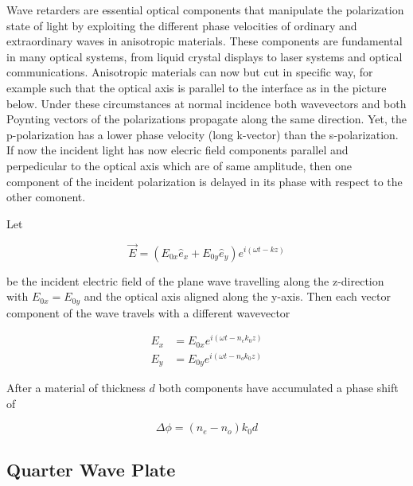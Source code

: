 \documentclass[
  a4paper,
]{book}
\begin{document}
Wave retarders are essential optical components that manipulate the
polarization state of light by exploiting the different phase velocities
of ordinary and extraordinary waves in anisotropic materials. These
components are fundamental in many optical systems, from liquid crystal
displays to laser systems and optical communications. Anisotropic
materials can now but cut in specific way, for example such that the
optical axis is parallel to the interface as in the picture below. Under
these circumstances at normal incidence both wavevectors and both
Poynting vectors of the polarizations propagate along the same
direction. Yet, the p-polarization has a lower phase velocity (long
k-vector) than the s-polarization. If now the incident light has now
elecric field components parallel and perpedicular to the optical axis
which are of same amplitude, then one component of the incident
polarization is delayed in its phase with respect to the other comonent.

Let

\[
\vec{E}=(E_{0x}\hat{e}_x +E_{0y}\hat{e}_y)e^{i(\omega t -k z)}
\]

be the incident electric field of the plane wave travelling along the
z-direction with \(E_{0x}=E_{0y}\) and the optical axis aligned along
the y-axis. Then each vector component of the wave travels with a
different wavevector

\[
\begin{aligned}
E_x & =  E_{0x}e^{i(\omega t -n_e k_0 z)}\\
E_y & =  E_{0y}e^{i(\omega t -n_o k_0 z)}
\end{aligned}
\]

After a material of thickness \(d\) both components have accumulated a
phase shift of

\[
\Delta \phi=(n_e-n_o)k_0 d
\]

\subsection{Quarter Wave Plate}\label{quarter-wave-plate}
\end{document}
